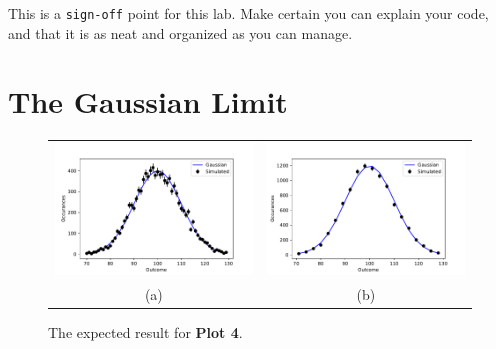 This is a {\tt sign-off} point for this lab.  Make certain you can
explain your code, and that it is as neat and organized as you can
manage.

\section{The Gaussian Limit}

\begin{figure}[htbp]
\begin{center}
\begin{tabular}{cc}
\includegraphics[height=0.22\textheight]{figs/labs/distributions/gauss_finebins.pdf} &
\includegraphics[height=0.22\textheight]{figs/labs/distributions/gauss.pdf} \\
(a) & (b) \\
\end{tabular}
\end{center}
\caption{\label{fig:gauss} The expected result for {\bf Plot 4}. }
\end{figure}

